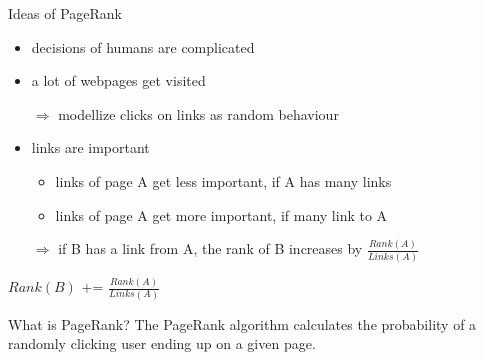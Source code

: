 
\begin{frame}{Ideas of PageRank}
    \begin{itemize}[<+->]
        \item decisions of humans are complicated
        \item a lot of webpages get visited
        \item[$\Rightarrow$] modellize clicks on links as random behaviour
        \item links are important
        \begin{itemize}
            \item links of page A get less important, if A has many links
            \item links of page A get more important, if many link to A
        \end{itemize}
        \item[$\Rightarrow$] if B has a link from A, the rank of B increases by $\frac{Rank(A)}{Links(A)}$
    \end{itemize}

    \pause[\thebeamerpauses]

    \begin{algorithmic}
            \State $Rank(B)$ += $\frac{Rank(A)}{Links(A)}$
        \EndIf
    \end{algorithmic}
\end{frame}

\begin{frame}{What is PageRank?}
    The PageRank algorithm calculates the probability of a randomly
    clicking user ending up on a given page.
\end{frame}





